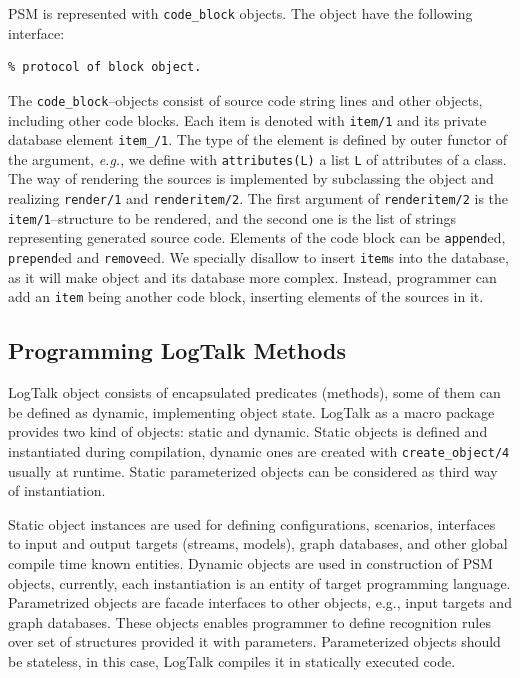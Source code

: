 \documentclass[conference]{IEEEtran}
\begin{document}
PSM is represented with \texttt{code\_block} objects.  The object have the following interface:
\begin{verbatim}
% protocol of block object.
\end{verbatim}

The \verb|code_block|--objects consist of source code string lines and other objects, including other code blocks. Each item is denoted with \verb|item/1| and its private database element \verb|item_/1|.  The type of the element is defined by outer functor of the argument, \emph{e.g.}, we define with \verb|attributes(L)| a list \verb|L| of attributes of a class.  The way of rendering the sources is implemented by subclassing the object and realizing \verb|render/1| and \verb|renderitem/2|.  The first argument of \verb|renderitem/2| is the \verb|item/1|--structure to be rendered, and the second one is the list of strings representing generated source code.  Elements of the code block can be \verb|append|ed, \verb|prepend|ed and \verb|remove|ed.  We specially disallow to insert \verb|item|s into the database, as it will make object and its database more complex.  Instead, programmer can add an \verb|item| being another code block, inserting elements of the sources in it.


\subsection{Programming LogTalk Methods}
\label{sec:lgt-methods}

LogTalk object consists of encapsulated predicates (methods), some of them can be defined as dynamic, implementing object state.  LogTalk as a macro package provides two kind of objects: static and dynamic.  Static objects is defined and instantiated during compilation, dynamic ones are created with \texttt{create\_object/4} usually at runtime.  Static parameterized objects can be considered as third way of instantiation.

Static object instances are used for defining configurations, scenarios, interfaces to input and output targets (streams, models), graph databases, and other global compile time known entities.  Dynamic objects are used in construction of PSM objects, currently, each instantiation is an entity of target programming language.  Parametrized objects are facade interfaces to other objects, e.g., input targets and graph databases.  These objects enables programmer to define recognition rules over set of structures provided it with parameters.  Parameterized objects should be stateless, in this case, LogTalk compiles it in statically executed code.
\end{document}

